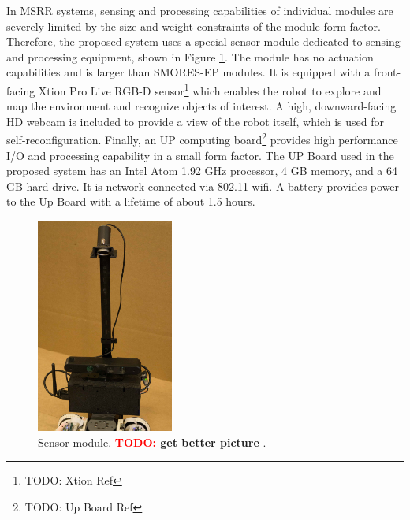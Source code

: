 \documentclass[conference]{IEEEtran}
\newcommand{\TODO}[1]{ {\bf \textcolor{red}{TODO:} #1 }}
\begin{document}
In MSRR systems, sensing and processing capabilities of individual modules are severely limited by the size and weight constraints of the module form factor. Therefore, the proposed system uses a special sensor module dedicated to sensing and processing equipment, shown in Figure \ref{fig:sensor-module}. The module has no actuation capabilities and is larger than SMORES-EP modules. It is equipped with a front-facing Xtion Pro Live RGB-D sensor\footnote{TODO: Xtion Ref} which enables the robot to explore and map the environment and recognize objects of interest. A high, downward-facing HD webcam is included to provide a view of the robot itself, which is used for self-reconfiguration. Finally, an UP computing board\footnote{TODO: Up Board Ref} provides high performance I/O and processing capability in a small form factor. The UP Board used in the proposed system has an Intel Atom 1.92 GHz processor, 4 GB memory, and a 64 GB hard drive. It is network connected via 802.11 wifi. A battery provides power to the Up Board with a lifetime of about 1.5 hours.

\begin{figure}
\begin{center}
\includegraphics[width=0.4\textwidth]{images/sensor_module.jpg}
\caption{Sensor module. \TODO{get better picture}.}
\label{fig:sensor-module}
\end{center}
\end{figure}

%
%

\end{document}
